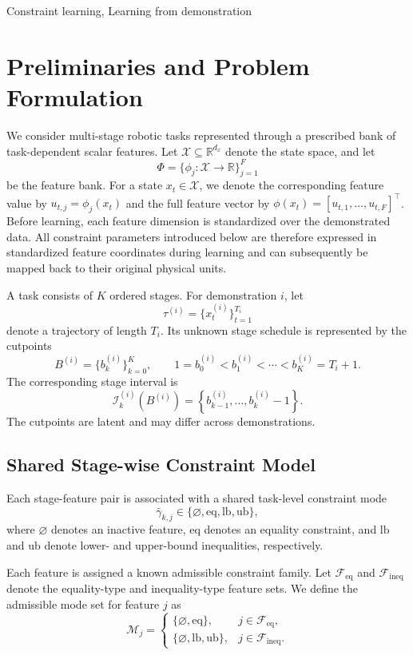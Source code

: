 \documentclass[lettersize,journal]{IEEEtran}
\begin{document}
\begin{IEEEkeywords}
Constraint learning, Learning from demonstration
\end{IEEEkeywords}
\section{Preliminaries and Problem Formulation}
\label{sec:preliminaries}

We consider multi-stage robotic tasks represented through a prescribed bank of
task-dependent scalar features. Let
$\mathcal{X}\subseteq\mathbb{R}^{d_x}$ denote the state space, and let
\[
\Phi=\{\phi_j:\mathcal{X}\rightarrow\mathbb{R}\}_{j=1}^{F}
\]
be the feature bank. For a state $x_t\in\mathcal{X}$, we denote the corresponding
feature value by
$u_{t,j}=\phi_j(x_t)$ and the full feature vector by
$\phi(x_t)=[u_{t,1},\dots,u_{t,F}]^\top$.
Before learning, each feature dimension is standardized over the demonstrated
data. All constraint parameters introduced below are therefore expressed in
standardized feature coordinates during learning and can subsequently be mapped
back to their original physical units.

A task consists of $K$ ordered stages. For demonstration $i$, let
\[
\tau^{(i)}
=
\{x_t^{(i)}\}_{t=1}^{T_i}
\]
denote a trajectory of length $T_i$. Its unknown stage schedule is represented by
the cutpoints
\[
B^{(i)}
=
\{b_k^{(i)}\}_{k=0}^{K},
\qquad
1=b_0^{(i)}<b_1^{(i)}<\cdots<b_K^{(i)}=T_i+1.
\]
The corresponding stage interval is
\begin{equation}
\mathcal{I}_k^{(i)}
\left(B^{(i)}\right)
=
\left\{
b_{k-1}^{(i)},\dots,b_k^{(i)}-1
\right\}.
\label{eq:stage_interval_map}
\end{equation}
The cutpoints are latent and may differ across demonstrations.

\subsection{Shared Stage-wise Constraint Model}

Each stage-feature pair is associated with a shared task-level constraint mode
\[
\bar{\gamma}_{k,j}
\in
\{\varnothing,\mathrm{eq},\mathrm{lb},\mathrm{ub}\},
\]
where $\varnothing$ denotes an inactive feature, $\mathrm{eq}$ denotes an
equality constraint, and $\mathrm{lb}$ and $\mathrm{ub}$ denote lower- and
upper-bound inequalities, respectively.

Each feature is assigned a known admissible constraint family. Let
$\mathcal{F}_{\mathrm{eq}}$ and $\mathcal{F}_{\mathrm{ineq}}$ denote the
equality-type and inequality-type feature sets. We define the admissible mode set
for feature $j$ as
\begin{equation}
\mathcal{M}_j
=
\begin{cases}
\{\varnothing,\mathrm{eq}\},
& j\in\mathcal{F}_{\mathrm{eq}},
\\
\{\varnothing,\mathrm{lb},\mathrm{ub}\},
& j\in\mathcal{F}_{\mathrm{ineq}}.
\end{cases}
\label{eq:admissible_mode_set_map}
\end{equation}
\end{document}
